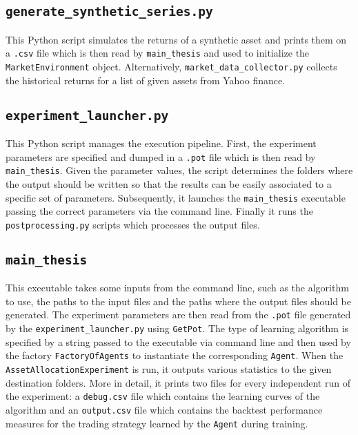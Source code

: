 \subsection{\lstinline{generate_synthetic_series.py}} This Python script simulates the returns of a synthetic asset and prints them on a \lstinline{.csv} file which is then read by \lstinline{main_thesis} and used to initialize the \lstinline{MarketEnvironment} object. Alternatively, \lstinline{market_data_collector.py} collects the historical returns for a list of given assets from Yahoo finance.

\subsection{\lstinline{experiment_launcher.py}} This Python script manages the execution pipeline. First, the experiment parameters are specified and dumped in a \lstinline{.pot} file which is then read by \lstinline{main_thesis}. Given the parameter values, the script determines the folders where the output should be written so that the results can be easily associated to a specific set of parameters. Subsequently, it launches the \lstinline{main_thesis} executable passing the correct parameters via the command line. Finally it runs the \lstinline{postprocessing.py} scripts which processes the output files.  

\subsection{\lstinline{main_thesis}} This executable takes some inputs from the command line, such as the algorithm to use, the paths to the input files and the paths where the output files should be generated. The experiment parameters are then read from the \lstinline{.pot} file generated by the \lstinline{experiment_launcher.py} using \lstinline{GetPot}. The type of learning algorithm is specified by a string passed to the executable via command line and then used by the factory \lstinline{FactoryOfAgents} to instantiate the corresponding \lstinline{Agent}. When the \lstinline{AssetAllocationExperiment} is run, it outputs various statistics to the given destination folders. More in detail, it prints two files for every independent run of the experiment: a \lstinline{debug.csv} file which contains the learning curves of the algorithm and an \lstinline{output.csv} file which contains the backtest performance measures for the trading strategy learned by the \lstinline{Agent} during training.   

